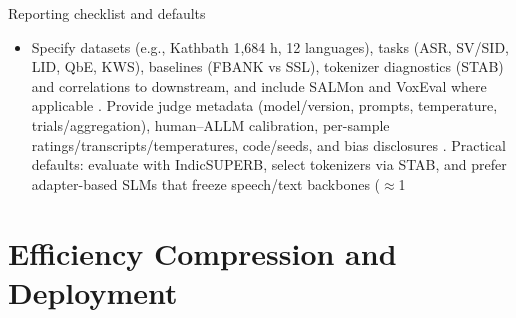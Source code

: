 \documentclass{article}
\begin{document}
Reporting checklist and defaults
\begin{itemize}
  \item Specify datasets (e.g., Kathbath 1,684 h, 12 languages), tasks (ASR, SV/SID, LID, QbE, KWS), baselines (FBANK vs SSL), tokenizer diagnostics (STAB) and correlations to downstream, and include SALMon and VoxEval where applicable \cite{entry2025indicsuperbspeechprocessinguniversalperf,vashishth2024stabspeechtokenizerassessmentbenchmark,maimon2025salmonsuiteacousticlanguagemodelevaluati,cui2025voxevalbenchmarkingknowledgeunderstandin}. Provide judge metadata (model/version, prompts, temperature, trials/aggregation), human--ALLM calibration, per-sample ratings/transcripts/temperatures, code/seeds, and bias disclosures \cite{wang2025bossbeyondsemanticspeech}. Practical defaults: evaluate with IndicSUPERB, select tokenizers via STAB, and prefer adapter-based SLMs that freeze speech/text backbones ($\approx$1%
\end{itemize}

















\section{Efficiency Compression and Deployment} \label{sec:efficiencycompressionanddeployment}
\end{document}
